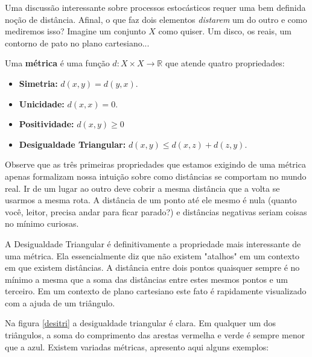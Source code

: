 Uma discussão interessante sobre processos estocásticos requer uma bem definida noção de distância. Afinal, o que faz dois elementos \textit{distarem} um do outro e como mediremos isso? Imagine um conjunto $X$ como quiser. Um disco, os reais, um contorno de pato no plano cartesiano... 

\begin{defi}
Uma \textbf{métrica} é uma função $d: X \times X \to \mathbb{R}$ que atende quatro propriedades:

\begin{itemize}
    \item \textbf{Simetria:} $d(x,y) = d(y,x)$. 
    \item \textbf{Unicidade:} $d(x,x) = 0$.
    \item \textbf{Positividade:} $d(x,y) \geq 0$
    \item \textbf{Desigualdade Triangular:} $d(x,y) \leq d(x,z) + d(z,y)$. 

\end{itemize}
\end{defi}

Observe que as três primeiras propriedades que estamos exigindo de uma métrica apenas formalizam nossa intuição sobre como distâncias se comportam no mundo real. Ir de um lugar ao outro deve cobrir a mesma distância que a volta se usarmos a mesma rota. A distância de um ponto até ele mesmo é nula (quanto você, leitor, precisa andar para ficar parado?) e distâncias negativas seriam coisas no mínimo curiosas.

A Desigualdade Triangular é definitivamente a propriedade mais interessante de uma métrica. Ela essencialmente diz que não existem "atalhos" em um contexto em que existem distâncias. A distância entre dois pontos quaisquer sempre é no mínimo a mesma que a soma das distâncias entre estes mesmos pontos e um terceiro. Em um contexto de plano cartesiano este fato é rapidamente visualizado com a ajuda de um triângulo. 

\begin{center}

\end{center}




Na figura \ref{desitri} a desigualdade triangular é clara. Em qualquer um dos triângulos, a soma do comprimento das arestas vermelha e verde é sempre menor que a azul. Existem variadas métricas, apresento aqui alguns exemplos:

